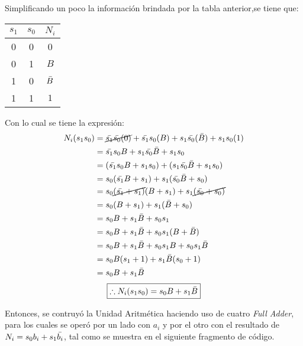 \documentclass[../procedimientos.tex]{subfiles}
\begin{document}
Simplificando un poco la información brindada por la tabla anterior,se tiene 
que:
\begin{table}[H]
  \centering
  \begin{tabular}{cc|c}
    \hline
    $s_1$ & $s_0$ & $N_i$\\
    \hline
    0 & 0 & 0\\
    0 & 1 & $B$\\
    1 & 0 & $\bar{B}$\\
    1 & 1 & $1$
  \end{tabular}
\end{table}

Con lo cual se tiene la expresión:
\begin{align*}
  N_i (s_1 s_0) &= \cancel{\bar{s_1} \bar{s_0} (0)} + \bar{s_1} s_0 (B) + s_1 
  \bar{s_0} (\bar{B}) + s_1 s_0 (1)\\
  &= \bar{s_1} s_0 B + s_1 \bar{s_0} \bar{B} + s_1 s_0\\
  &= (\bar{s_1} s_0 B + s_1 s_0) + (s_1 \bar{s_0} \bar{B} + s_1 s_0)\\
  &= s_0 (\bar{s_1} B + s_1) + s_1 (\bar{s_0} \bar{B} + s_0)\\
  &= s_0 \cancel{(\bar{s_1} + s_1)} (B + s_1) + s_1 \cancel{(\bar{s_0}+s_0)}\\
  &= s_0 (B + s_1) + s_1 (\bar{B} + s_0)\\
  &= s_0 B  + s_1 \bar{B} + s_0 s_1\\
  &= s_0 B  + s_1 \bar{B} + s_0 s_1 (B + \bar{B})\\
  &= s_0 B  + s_1 \bar{B} + s_0 s_1 B + s_0 s_1 \bar{B}\\
  &= s_0 B (s_1 + 1)  + s_1 \bar{B} (s_0 + 1)\\
  &= s_0 B + s_1 \bar{B}
\end{align*}
\begin{equation*}
  \boxed{
    \therefore N_i (s_1 s_0) = s_0 B + s_1 \bar{B}
  }
\end{equation*}

Entonces, se contruyó la Unidad Aritmética haciendo uso de cuatro \textit{Full 
Adder}, para los cuales se operó por un lado con $a_i$ y por el otro con el 
resultado de $N_i = s_0 b_i + s_1 \bar{b_i}$, tal como se muestra en el 
siguiente fragmento de código.
\end{document}
